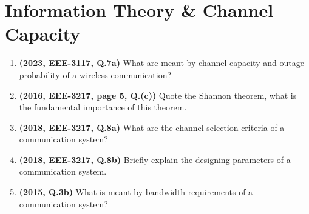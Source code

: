 \documentclass[12pt, a4paper]{article}
\begin{document}
	\section{Information Theory \& Channel Capacity}
	\begin{enumerate}
		\item \textbf{(2023, EEE-3117, Q.7a)} What are meant by channel capacity and outage probability of a wireless communication?
		\item \textbf{(2016, EEE-3217, page 5, Q.(c))} Quote the Shannon theorem, what is the fundamental importance of this theorem.
		\item \textbf{(2018, EEE-3217, Q.8a)} What are the channel selection criteria of a communication system?
		\item \textbf{(2018, EEE-3217, Q.8b)} Briefly explain the designing parameters of a communication system.
		\item \textbf{(2015, Q.3b)} What is meant by bandwidth requirements of a communication system?
	\end{enumerate}
	
\end{document}
